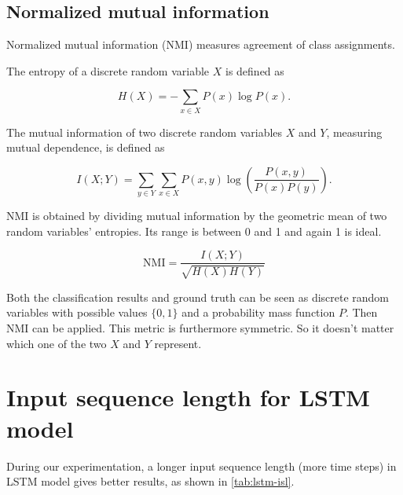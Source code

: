 \documentclass[11pt,a4paper]{report}
\begin{document}
\subsection{Normalized mutual information}

Normalized mutual information (NMI) measures agreement of class assignments.

The entropy of a discrete random variable \(X\) is defined as

\begin{equation*}
  H(X) = - \sum_{x \in X} P(x) \log P(x).
\end{equation*}

The mutual information of two discrete random variables \(X\) and \(Y\), measuring mutual dependence, is defined as

\begin{equation*}
  I(X;Y) = \sum_{y \in Y} \sum_{x \in X} P(x,y) \log \left(\frac{P(x,y)}{P(x)P(y)}\right).
\end{equation*}

NMI is obtained by dividing mutual information by the geometric mean of two random variables' entropies.
Its range is between 0 and 1 and again 1 is ideal.

\begin{equation*}
  \mathrm{NMI} = \frac{I(X;Y)}{\sqrt{H(X)H(Y)}}
\end{equation*}

Both the classification results and ground truth can be seen as discrete random variables with possible values \(\lbrace 0,1 \rbrace\) and a probability mass function \(P\).
Then NMI can be applied.
This metric is furthermore symmetric.
So it doesn't matter which one of the two \(X\) and \(Y\) represent.

\newpage

\section{Input sequence length for LSTM model}

During our experimentation, a longer input sequence length (more time steps) in LSTM model gives better results, as shown in \autoref{tab:lstm-isl}.
\end{document}
